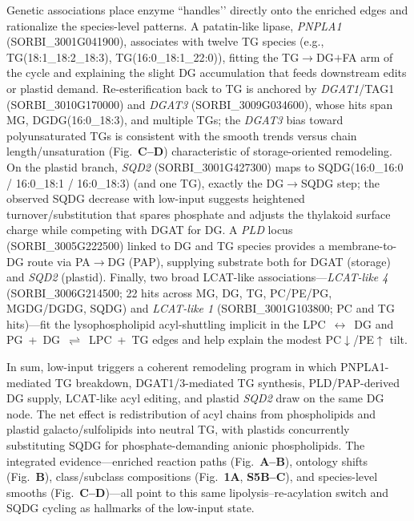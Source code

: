 \documentclass[10pt,letterpaper]{article}
\begin{document}
Genetic associations place enzyme “handles’’ directly onto the enriched edges and rationalize the species-level patterns. A patatin-like lipase, \textit{PNPLA1} (SORBI\_3001G041900), associates with twelve TG species (e.g., TG(18{:}1\_18{:}2\_18{:}3), TG(16{:}0\_18{:}1\_22{:}0)), fitting the TG$\rightarrow$DG$+$FA arm of the cycle and explaining the slight DG accumulation that feeds downstream edits or plastid demand. Re-esterification back to TG is anchored by \textit{DGAT1}/TAG1 (SORBI\_3010G170000) and \textit{DGAT3} (SORBI\_3009G034600), whose hits span MG, DGDG(16{:}0\_18{:}3), and multiple TGs; the \textit{DGAT3} bias toward polyunsaturated TGs is consistent with the smooth trends versus chain length/unsaturation (Fig.\ \textbf{C–D}) characteristic of storage-oriented remodeling. On the plastid branch, \textit{SQD2} (SORBI\_3001G427300) maps to SQDG(16{:}0\_16{:}0 / 16{:}0\_18{:}1 / 16{:}0\_18{:}3) (and one TG), exactly the DG$\rightarrow$SQDG step; the observed SQDG decrease with low-input suggests heightened turnover/substitution that spares phosphate and adjusts the thylakoid surface charge while competing with DGAT for DG. A \textit{PLD} locus (SORBI\_3005G222500) linked to DG and TG species provides a membrane-to-DG route via PA$\rightarrow$DG (PAP), supplying substrate both for DGAT (storage) and \textit{SQD2} (plastid). Finally, two broad LCAT-like associations—\textit{LCAT-like 4} (SORBI\_3006G214500; 22 hits across MG, DG, TG, PC/PE/PG, MGDG/DGDG, SQDG) and \textit{LCAT-like 1} (SORBI\_3001G103800; PC and TG hits)—fit the lysophospholipid acyl-shuttling implicit in the \mbox{LPC $\leftrightarrow$ DG} and \mbox{PG + DG $\rightleftharpoons$ LPC + TG} edges and help explain the modest PC$\downarrow$/PE$\uparrow$ tilt.

In sum, low-input triggers a coherent remodeling program in which PNPLA1-mediated TG breakdown, DGAT1/3-mediated TG synthesis, PLD/PAP-derived DG supply, LCAT-like acyl editing, and plastid \textit{SQD2} draw on the same DG node. The net effect is redistribution of acyl chains from phospholipids and plastid galacto/sulfolipids into neutral TG, with plastids concurrently substituting SQDG for phosphate-demanding anionic phospholipids. The integrated evidence—enriched reaction paths (Fig.\ \textbf{A–B}), ontology shifts (Fig.\ \textbf{B}), class/subclass compositions (Fig.\ \textbf{1A}, \textbf{S5B–C}), and species-level smooths (Fig.\ \textbf{C–D})—all point to this same lipolysis–re-acylation switch and SQDG cycling as hallmarks of the low-input state.
\end{document}
